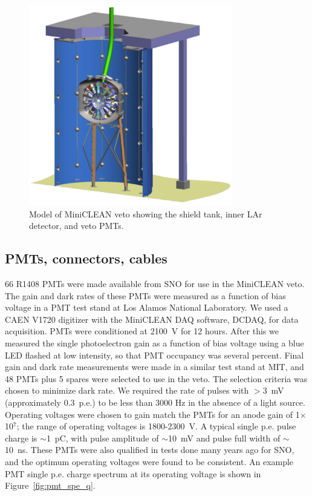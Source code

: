 \documentclass{JINST}
\begin{document}
\begin{figure}[ht]
\begin{center}
\includegraphics[width=3.5in]{graphics/miniclean_overview_drawing.pdf}
\caption{Model of MiniCLEAN veto showing the shield tank, inner LAr detector, and veto PMTs.
\label{fig:veto_geom}}
\end{center}
\end{figure}

\subsection{PMTs, connectors, cables}
\label{sec:pmts}
%
66 R1408 PMTs were made available from SNO for use in the MiniCLEAN
veto. The gain and dark rates of these PMTs were measured as a
function of bias voltage in a PMT test stand at Los Alamos National
Laboratory.  We used a CAEN V1720 digitizer with the MiniCLEAN DAQ
software, DCDAQ, for data acquisition. PMTs were conditioned at 2100~V
for 12 hours. After this we measured the single photoelectron gain as a
function of bias voltage using a blue LED flashed at low
intensity, so that PMT occupancy was several percent. Final gain and
dark rate measurements were made in a similar test stand at MIT, and
48 PMTs plus 5 spares were selected to use in the veto.  The selection
criteria was chosen to minimize dark rate.  We required the rate of pulses with
$>$3~mV (approximately 0.3~p.e.) to be less than 3000 Hz in the
absence of a light source.  Operating voltages were chosen to gain
match the PMTs for an anode gain of 1$\times$10$^7$; the range of
operating voltages is 1800-2300~V.  A typical single p.e. pulse charge
is $\sim$1~pC, with pulse amplitude of $\sim$10~mV and pulse full width of
$\sim$10~ns.  These PMTs were also qualified in tests done many years ago for
SNO, and the optimum operating voltages were found to be consistent.
An example PMT single p.e. charge spectrum at its operating voltage is
shown in Figure~\ref{fig:pmt_spe_q}.
\end{document}
